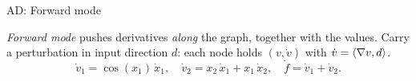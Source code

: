 \documentclass[9pt]{beamer}
\begin{document}
\begin{frame}{AD: Forward mode}

  \emph{Forward mode} pushes derivatives \emph{along} the graph, together with the
  values. Carry a perturbation in input direction $d$: each node holds $(v, \dot v)$
  with $\dot v = \left<\nabla v, d\right>$.
  \[
    \dot v_1 = \cos(x_1)\,\dot x_1,\quad
    \dot v_2 = x_2\,\dot x_1 + x_1\,\dot x_2,\quad
    \dot f = \dot v_1 + \dot v_2.
  \]

  \vfill


\end{frame}
\end{document}
